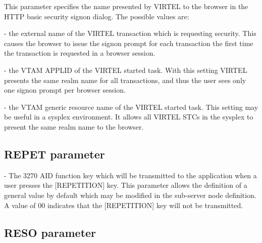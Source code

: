 \documentclass[letterpaper,10pt,english]{sphinxmanual}
\begin{document}
This parameter specifies the name presented by VIRTEL to the browser in the HTTP basic security signon dialog. The possible values are:

 - the external name of the VIRTEL transaction which is requesting security. This causes the browser to issue the signon prompt for each transaction the first time the transaction is requested in a browser session.

 - the VTAM APPLID of the VIRTEL started task. With this setting VIRTEL presents the same realm name for all transactions, and thus the user sees only one signon prompt per browser session.

 - the VTAM generic resource name of the VIRTEL started task. This setting may be useful in a sysplex environment. It allows all VIRTEL STCs in the sysplex to present the same realm name to the browser.


\subsection{REPET parameter}
\label{\detokenize{Installation_Guide:index-106}}\label{\detokenize{Installation_Guide:repet-parameter}}
\begin{sphinxVerbatim}[commandchars=\\\{\}]
  
\end{sphinxVerbatim}

 - The 3270 AID function key which will be transmitted to the application when a user presses the {[}REPETITION{]} key. This parameter allows the definition of a general value by default which may be modified in the sub-server node definition. A value of 00 indicates that the {[}REPETITION{]} key will not be transmitted.


\subsection{RESO parameter}
\label{\detokenize{Installation_Guide:reso-parameter}}\label{\detokenize{Installation_Guide:index-107}}
\begin{sphinxVerbatim}[commandchars=\\\{\}]
 
\end{sphinxVerbatim}
\end{document}
